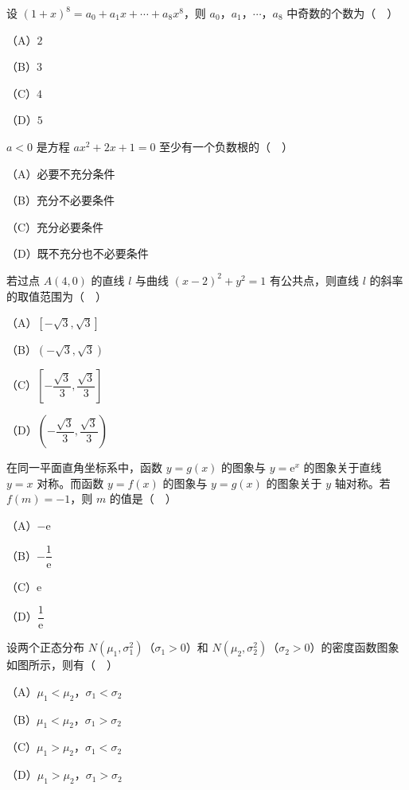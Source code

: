 \begin{question}
设 $(1+x)^8=a_0+a_1x+\cdots+a_8x^8$，则 $a_0$，$a_1$，$\cdots$，$a_8$ 中奇数的个数为（　）

（A）$2$

（B）$3$

（C）$4$

（D）$5$

\end{question}
\begin{question}
$a<0$ 是方程 $ax^2+2x+1=0$ 至少有一个负数根的（　）

（A）必要不充分条件

（B）充分不必要条件

（C）充分必要条件

（D）既不充分也不必要条件

\end{question}
\begin{question}
若过点 $A(4,0)$ 的直线 $l$ 与曲线 $(x-2)^2+y^2=1$ 有公共点，则直线 $l$ 的斜率的取值范围为（　）

（A）$[-\sqrt3,\sqrt3]$

（B）$(-\sqrt3,\sqrt3)$

（C）$\left[-\dfrac{\sqrt3}{3},\dfrac{\sqrt3}{3}\right]$

（D）$\left(-\dfrac{\sqrt3}{3},\dfrac{\sqrt3}{3}\right)$

\end{question}
\begingroup
\renewenvironment{question}{\Needspace{0.48\textheight}}{}
\begin{question}
在同一平面直角坐标系中，函数 $y=g(x)$ 的图象与 $y=\mathrm e^x$ 的图象关于直线 $y=x$ 对称。而函数 $y=f(x)$ 的图象与 $y=g(x)$ 的图象关于 $y$ 轴对称。若 $f(m)=-1$，则 $m$ 的值是（　）

（A）$-\mathrm e$

（B）$-\dfrac1{\mathrm e}$

（C）$\mathrm e$

（D）$\dfrac1{\mathrm e}$

\Needspace{0.4\textheight}
\end{question}
\endgroup
\begin{question}
设两个正态分布 $N(\mu_1,\sigma_1^2)$（$\sigma_1>0$）和 $N(\mu_2,\sigma_2^2)$（$\sigma_2>0$）的密度函数图象如图所示，则有（　）
\nopagebreak[4]
\begin{center}\end{center}
\nopagebreak[4]
（A）$\mu_1<\mu_2$，$\sigma_1<\sigma_2$

（B）$\mu_1<\mu_2$，$\sigma_1>\sigma_2$

（C）$\mu_1>\mu_2$，$\sigma_1<\sigma_2$

（D）$\mu_1>\mu_2$，$\sigma_1>\sigma_2$

\end{question}
